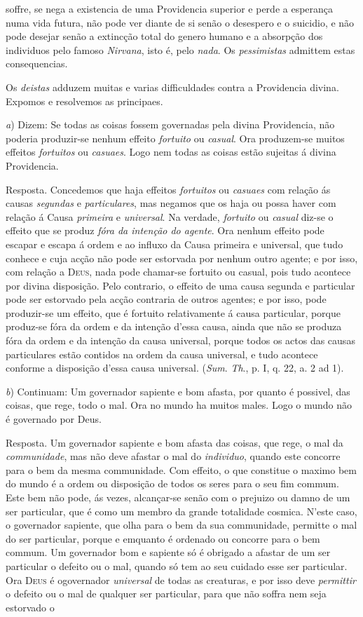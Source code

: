 soffre, se nega a existencia de uma Providencia superior e perde a esperança numa vida futura, não pode ver diante de si senão o desespero e o suicidio, e não pode desejar senão a extincção total do genero humano e a absorpção dos individuos pelo famoso \emph{Nirvana}, isto é, pelo \emph{nada}. Os \emph{pessimistas} admittem estas consequencias.\par Os \emph{deistas} adduzem muitas e varias difficuldades contra a Providencia divina. Expomos e resolvemos as principaes.\par \emph{a}) Dizem: Se todas as coisas fossem governadas pela divina Providencia, não poderia produzir-se nenhum effeito \emph{fortuito} ou \emph{casual}. Ora produzem-se muitos effeitos \emph{fortuitos} ou \emph{casuaes}. Logo nem todas as coisas estão sujeitas á divina Providencia.\par Resposta. Concedemos que haja effeitos \emph{fortuitos} ou \emph{casuaes} com relação ás causas \emph{segundas} e \emph{particulares}, mas negamos que os haja ou possa haver com relação á Causa \emph{primeira} e \emph{universal}. Na verdade, \emph{fortuito} ou \emph{casual} diz-se o effeito que se produz \emph{fóra da intenção do agente}. Ora nenhum effeito pode escapar e escapa á ordem e ao influxo da Causa primeira e universal, que tudo conhece e cuja acção não pode ser estorvada por nenhum outro agente; e por isso, com relação a \textsc{Deus}, nada pode chamar-se fortuito ou casual, pois tudo acontece por divina disposição. Pelo contrario, o effeito de uma causa segunda e particular pode ser estorvado pela acção contraria de outros agentes; e por isso, pode produzir-se um effeito, que é fortuito relativamente á causa particular, porque produz-se fóra da ordem e da intenção d'essa causa, ainda que não se produza fóra da ordem e da intenção da causa universal, porque todos os actos das causas particulares estão contidos na ordem da causa universal, e tudo acontece conforme a disposição d'essa causa universal. (\emph{Sum}. \emph{Th}., p. I, q. 22, a. 2 ad 1).\par \emph{b}) Continuam: Um governador sapiente e bom afasta, por quanto é possivel, das coisas, que rege, todo o mal. Ora no mundo ha muitos males. Logo o mundo não é governado por Deus.\par Resposta. Um governador sapiente e bom afasta das coisas, que rege, o mal da \emph{communidade}, mas não deve afastar o mal do \emph{individuo}, quando este concorre para o bem da mesma communidade. Com effeito, o que constitue o maximo bem do mundo é a ordem ou disposição de todos os seres para o seu fim commum. Este bem não pode, ás vezes, alcançar-se senão com o prejuizo ou damno de um ser particular, que é como um membro da grande totalidade cosmica. N'este caso, o governador sapiente, que olha para o bem da sua communidade, permitte o mal do ser particular, porque e emquanto é ordenado ou concorre para o bem commum. Um governador bom e sapiente só é obrigado a afastar de um ser particular o defeito ou o mal, quando só tem ao seu cuidado esse ser particular. Ora \textsc{Deus} é ogovernador \emph{universal} de todas as creaturas, e por isso deve \emph{permittir} o defeito ou o mal de qualquer ser particular, para que não soffra nem seja estorvado o 